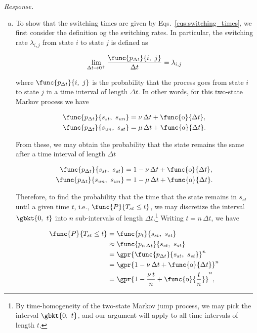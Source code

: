 \textit{Response.} 

\begin{enumerate}[a)]
	\item To show that the switching times are given by Eqs.~\ref{eqs:switching_times}, we first consider the definition og the switching rates. In particular, the switching rate $\lambda_{i,j}$ from state $i$ to state $j$ is defined as
	
		\begin{equation}
			\lim_{\Delta t \to 0^{+}} \frac{\func{p_{\Delta t}}{i,\ j}}{\Delta t} = \lambda_{i,j}
		\end{equation}
		
		where $\func{p_{\Delta t}}{i,\ j}$ is the probability that the process goes from state $i$ to state $j$ in a time interval of length $\Delta t$. In other words, for this two-state Markov process we have
	
		\begin{subequations}
			\begin{align}
				\func{p_{\Delta t}}{s_{st},\ s_{un}} &= \nu\,\Delta t + \func{\text{o}}{\Delta t},\\
				\func{p_{\Delta t}}{s_{un},\ s_{st}} &= \mu\,\Delta t + \func{\text{o}}{\Delta t}.
			\end{align}
		\end{subequations}
		
		From these, we may obtain the probability that the state remains the same after a time interval of length $\Delta t$
		
		\begin{subequations}
			\begin{align}
				\func{p_{\Delta t}}{s_{st},\ s_{st}} &= 1 - \nu\,\Delta t + \func{\text{o}}{\Delta t},\\
				\func{p_{\Delta t}}{s_{un},\ s_{un}} &= 1 - \mu\,\Delta t + \func{\text{o}}{\Delta t}.
			\end{align}
		\end{subequations}
		
		Therefore, to find the probability that the time that the state remains in $s_{st}$ until a given time $t$, i.e., $\func{P}{T_{st} \leq t}$, we may discretize the interval $\gbkt{0,\ t}$ into $n$ sub-intervals of length $\Delta t$.\footnote{By time-homogeneity of the two-state Markov jump process, we may pick the interval $\gbkt{0,\ t}$, and our argument will apply to all time intervals of length $t$.} Writing $t = n\,\Delta t$, we have
		
		\begin{align}
			\func{P}{T_{st} \leq t} &= \func{p_{t}}{s_{st},\ s_{st}} \nonumber \\
				&\approx \func{p_{n\,\Delta t}}{s_{st},\ s_{st}} \nonumber \\
				&= \gpr{\func{p_{\Delta t}}{s_{st},\ s_{st}}}^n \nonumber \\
				&= \gpr{1 - \nu\,\Delta t + \func{\text{o}}{\Delta t}}^n \nonumber \\
				&= \gpr{1 - \frac{\nu\,t}{n} + \func{\text{o}}{\frac{t}{n}}}^n,
		\end{align}
		

\end{enumerate}
